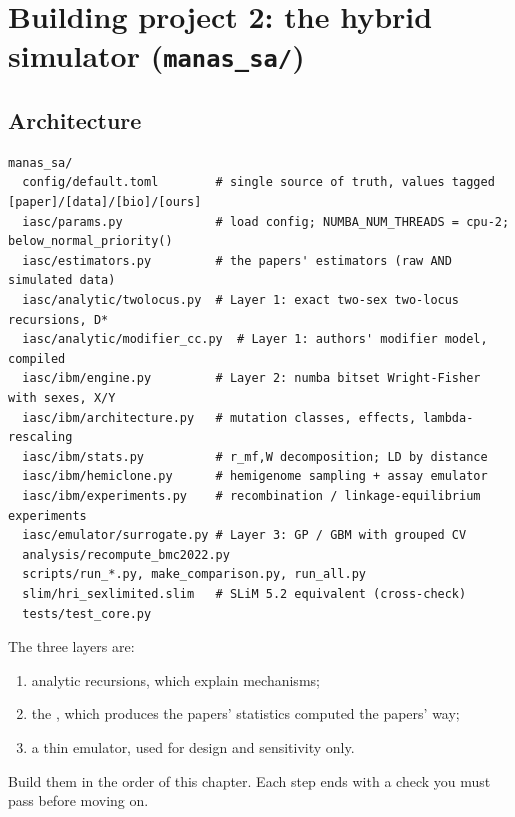 \chapter{Building project 2: the hybrid simulator (\texttt{manas\_sa/})}\label{ch:build2}

\section{Architecture}
\begin{lstlisting}[style=sh]
manas_sa/
  config/default.toml        # single source of truth, values tagged [paper]/[data]/[bio]/[ours]
  iasc/params.py             # load config; NUMBA_NUM_THREADS = cpu-2; below_normal_priority()
  iasc/estimators.py         # the papers' estimators (raw AND simulated data)
  iasc/analytic/twolocus.py  # Layer 1: exact two-sex two-locus recursions, D*
  iasc/analytic/modifier_cc.py  # Layer 1: authors' modifier model, compiled
  iasc/ibm/engine.py         # Layer 2: numba bitset Wright-Fisher with sexes, X/Y
  iasc/ibm/architecture.py   # mutation classes, effects, lambda-rescaling
  iasc/ibm/stats.py          # r_mf,W decomposition; LD by distance
  iasc/ibm/hemiclone.py      # hemigenome sampling + assay emulator
  iasc/ibm/experiments.py    # recombination / linkage-equilibrium experiments
  iasc/emulator/surrogate.py # Layer 3: GP / GBM with grouped CV
  analysis/recompute_bmc2022.py
  scripts/run_*.py, make_comparison.py, run_all.py
  slim/hri_sexlimited.slim   # SLiM 5.2 equivalent (cross-check)
  tests/test_core.py
\end{lstlisting}
The three layers are:
\begin{enumerate}
\item analytic recursions, which explain mechanisms;
\item the \IBM, which produces the papers' statistics computed the papers' way;
\item a thin emulator, used for design and sensitivity only.
\end{enumerate}
Build them in the order of this chapter. Each step ends with a check you must pass before moving on.

